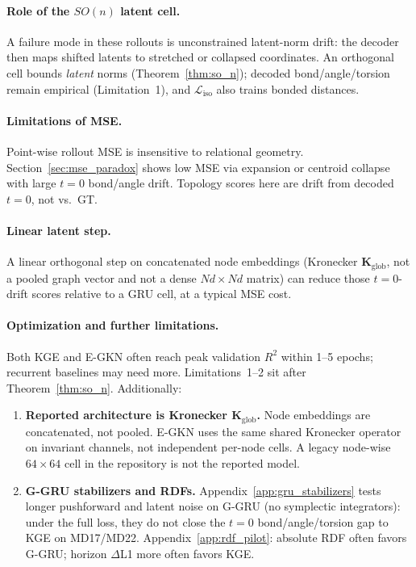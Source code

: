 \documentclass{article}
\newcommand{\K}{\mathbf{K}}
\newcommand{\GKE}{\textsc{KGE}}
\newcommand{\EGKN}{\textsc{E-GKN}}
\newcommand{\GGRU}{\textsc{G-GRU}}
\begin{document}
\paragraph{Role of the $SO(n)$ latent cell.}
A failure mode in these rollouts is unconstrained latent-norm drift: the decoder then maps shifted latents to stretched or collapsed coordinates. An orthogonal cell bounds \emph{latent} norms (Theorem~\ref{thm:so_n}); decoded bond/angle/torsion remain empirical (Limitation~1), and $\mathcal{L}_{\text{iso}}$ also trains bonded distances.

\paragraph{Limitations of MSE.}
Point-wise rollout MSE is insensitive to relational geometry. Section~\ref{sec:mse_paradox} shows low MSE via expansion or centroid collapse with large $t=0$ bond/angle drift. Topology scores here are drift from decoded $t=0$, not vs.\ GT.

\paragraph{Linear latent step.}
A linear orthogonal step on concatenated node embeddings (Kronecker $\K_{\text{glob}}$, not a pooled graph vector and not a dense $Nd\times Nd$ matrix) can reduce those $t=0$-drift scores relative to a GRU cell, at a typical MSE cost.

\paragraph{Optimization and further limitations.}
Both \GKE{} and \EGKN{} often reach peak validation $R^2$ within 1--5 epochs; recurrent baselines may need more. Limitations~1--2 sit after Theorem~\ref{thm:so_n}. Additionally:
\begin{enumerate}
  \item \textbf{Reported architecture is Kronecker $\K_{\text{glob}}$.} Node embeddings are concatenated, not pooled. E-GKN uses the same shared Kronecker operator on invariant channels, not independent per-node cells. A legacy node-wise $64\times 64$ cell in the repository is not the reported model.
  \item \textbf{G-GRU stabilizers and RDFs.} Appendix~\ref{app:gru_stabilizers} tests longer pushforward and latent noise on \GGRU{} (no symplectic integrators): under the full loss, they do not close the $t=0$ bond/angle/torsion gap to \GKE{} on MD17/MD22. Appendix~\ref{app:rdf_pilot}: absolute RDF often favors \GGRU{}; horizon $\Delta$L1 more often favors \GKE{}.
\end{enumerate}
\end{document}
